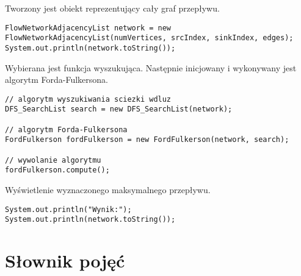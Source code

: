 \documentclass[10pt]{dokument-tiwo}
\begin{document}
\noindent
Tworzony jest obiekt reprezentujący cały graf przepływu.
\begin{lstlisting}
FlowNetworkAdjacencyList network = new FlowNetworkAdjacencyList(numVertices, srcIndex, sinkIndex, edges);
System.out.println(network.toString());
\end{lstlisting}

\noindent
Wybierana jest funkcja wyszukująca. Następnie inicjowany i wykonywany jest
algorytm Forda-Fulkersona.
\begin{lstlisting}
// algorytm wyszukiwania sciezki wdluz
DFS_SearchList search = new DFS_SearchList(network);

// algorytm Forda-Fulkersona
FordFulkerson fordFulkerson = new FordFulkerson(network, search);

// wywolanie algorytmu
fordFulkerson.compute();
\end{lstlisting}

\noindent
Wyświetlenie wyznaczonego maksymalnego przepływu.
\begin{lstlisting}
System.out.println("Wynik:");
System.out.println(network.toString());
\end{lstlisting}


\section{Słownik pojęć}
\label{sec:slownik}
\end{document}
